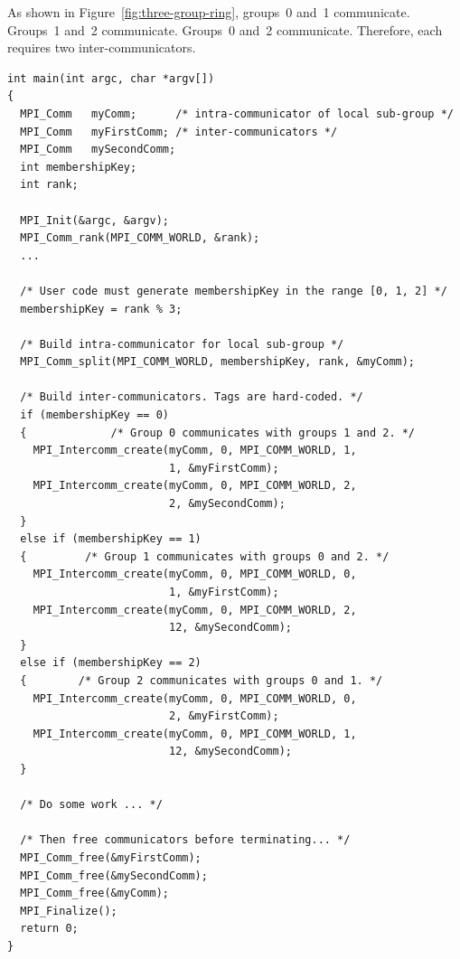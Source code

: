 
As shown in Figure~\ref{fig:three-group-ring},
groups~0 and~1 communicate. Groups~1 and~2 communicate. Groups~0 and~2
communicate. Therefore, each requires two inter-communicators.

\begin{example}
%
\begin{lstlisting}[language={[MPI]C}]
int main(int argc, char *argv[])
{
  MPI_Comm   myComm;      /* intra-communicator of local sub-group */
  MPI_Comm   myFirstComm; /* inter-communicators */
  MPI_Comm   mySecondComm;
  int membershipKey;
  int rank;

  MPI_Init(&argc, &argv);
  MPI_Comm_rank(MPI_COMM_WORLD, &rank);
  ...

  /* User code must generate membershipKey in the range [0, 1, 2] */
  membershipKey = rank % 3;

  /* Build intra-communicator for local sub-group */
  MPI_Comm_split(MPI_COMM_WORLD, membershipKey, rank, &myComm);

  /* Build inter-communicators. Tags are hard-coded. */
  if (membershipKey == 0)
  {             /* Group 0 communicates with groups 1 and 2. */
    MPI_Intercomm_create(myComm, 0, MPI_COMM_WORLD, 1,
                         1, &myFirstComm);
    MPI_Intercomm_create(myComm, 0, MPI_COMM_WORLD, 2,
                         2, &mySecondComm);
  }
  else if (membershipKey == 1)
  {         /* Group 1 communicates with groups 0 and 2. */
    MPI_Intercomm_create(myComm, 0, MPI_COMM_WORLD, 0,
                         1, &myFirstComm);
    MPI_Intercomm_create(myComm, 0, MPI_COMM_WORLD, 2,
                         12, &mySecondComm);
  }
  else if (membershipKey == 2)
  {        /* Group 2 communicates with groups 0 and 1. */
    MPI_Intercomm_create(myComm, 0, MPI_COMM_WORLD, 0,
                         2, &myFirstComm);
    MPI_Intercomm_create(myComm, 0, MPI_COMM_WORLD, 1,
                         12, &mySecondComm);
  }

  /* Do some work ... */

  /* Then free communicators before terminating... */
  MPI_Comm_free(&myFirstComm);
  MPI_Comm_free(&mySecondComm);
  MPI_Comm_free(&myComm);
  MPI_Finalize();
  return 0;
}
\end{lstlisting}
\end{example}
  

